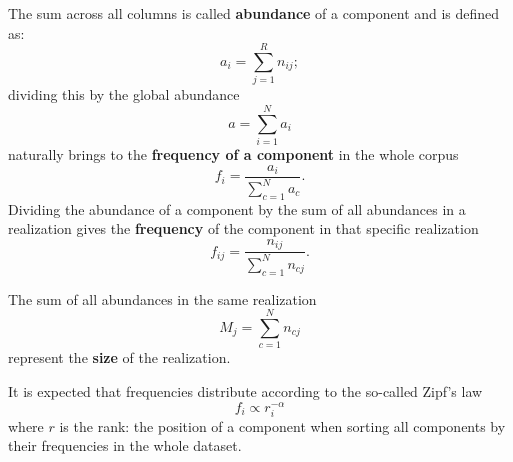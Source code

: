 The sum across all columns is called \textbf{abundance} of a component and is defined as:
\begin{equation}\label{eq:abundance}
a_i=\sum_{j=1}^{R}n_{ij};
\end{equation}
dividing this by the global abundance 
\begin{equation}
  a=\sum_{i=1}^{N}a_i
\end{equation}
naturally brings to the \textbf{frequency of a component} in the whole corpus
\begin{equation}\label{eq:fi}
f_i=\frac{a_i}{\sum_{c=1}^{N}a_{c}}.
\end{equation}
Dividing the abundance of a component by the sum of all abundances in a realization gives the \textbf{frequency} of the component in that specific realization
\begin{equation}
f_{ij}=\frac{n_{ij}}{\sum_{c=1}^{N}n_{cj}}.
\end{equation}

The sum of all abundances in the same realization
\begin{equation}\label{eq:size}
M_j=\sum_{c=1}^{N}n_{cj}
\end{equation}
represent the \textbf{size} of the realization.

It is expected that frequencies distribute according to the so-called Zipf's law
\begin{equation}\label{eq:zipf}
f_i\propto r_i^{-\alpha}
\end{equation}
where $r$ is the rank: the position of a component when sorting all components by their frequencies in the whole dataset.